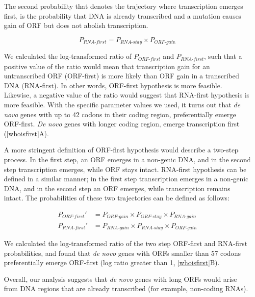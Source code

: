 \documentclass[12pt,a4paper]{article}
\begin{document}
The second probability that denotes the trajectory where transcription emerges first, is the probability that DNA is already transcribed and a mutation causes gain of ORF but does not abolish transcription. 

\begin{equation}
P_\textit{RNA-first} = P_\textit{RNA-stay}\times P_\textit{ORF-gain}
\label{rnafirsteq1}
\end{equation}

We calculated the log-transformed ratio of $P_\textit{ORF-first}$ and $P_\textit{RNA-first}$, such that a positive value of the ratio would mean that transcription gain for an untranscribed ORF (ORF-first) is more likely than ORF gain in a transcribed DNA (RNA-first). In other words, ORF-first hypothesis is more feasible. Likewise, a negative value of the ratio would suggest that RNA-first hypothesis is more feasible. With the specific parameter values we used, it turns out that \textit{de novo} genes with up to 42 codons in their coding region, preferentially emerge ORF-first. \textit{De novo} genes with longer coding region, emerge transcription first (\autoref{whoisfirst}A).

A more stringent definition of ORF-first hypothesis would describe a two-step process. In the first step, an ORF emerges in a non-genic DNA, and in the second step transcription emerges, while ORF stays intact. RNA-first hypothesis can be defined in a similar manner; in the first step transcription emerges in a non-genic DNA, and in the second step an ORF emerges, while transcription remains intact. The probabilities of these two trajectories can be defined as follows:

\begin{align}
P_\textit{ORF-first}' & = P_\textit{ORF-gain} \times P_\textit{ORF-stay}\times P_\textit{RNA-gain} \label{orffirsteq2}\\[1em]
P_\textit{RNA-first}' & = P_\textit{RNA-gain} \times P_\textit{RNA-stay}\times P_\textit{ORF-gain}
\label{rnafirsteq2}
\end{align}

We calculated the log-transformed ratio of the two step ORF-first and RNA-first probabilities, and found that \textit{de novo} genes with ORFs smaller than 57 codons preferentially emerge ORF-first (log ratio greater than 1, \autoref{whoisfirst}B). 

Overall, our analysis suggests that \textit{de novo} genes with long ORFs would arise from DNA regions that are already transcribed (for example, non-coding RNAs). 
\end{document}
